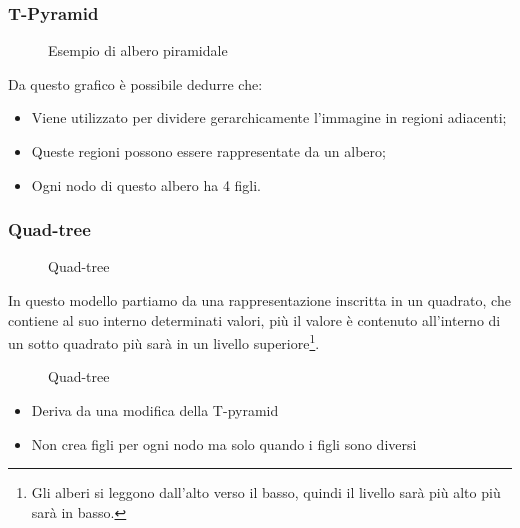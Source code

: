 \documentclass{report}
\begin{document}
\subsubsection{T-Pyramid}
\label{sec:treepy}
\begin{figure}[ht!]
  \centering
  \resizebox{15cm}{!}{
  }
  \caption{Esempio di albero piramidale}
  \label{fig:alberopir}
\end{figure}
Da questo grafico è possibile dedurre che:
\begin{itemize}
\item Viene utilizzato per dividere gerarchicamente l'immagine in regioni
  adiacenti;
\item Queste regioni possono essere rappresentate da un albero;
\item Ogni nodo di questo albero ha 4 figli.
\end{itemize}

\subsubsection{Quad-tree}
\label{sec:quad-tree}
\begin{figure}[ht!]
  \centering
  
  \caption{Quad-tree}
  \label{fig:qtree1}
\end{figure}
In questo modello partiamo da una rappresentazione inscritta in un
quadrato, che contiene al suo interno determinati valori, più il valore
è contenuto all'interno di un sotto quadrato più sarà in un livello
superiore\footnote{Gli alberi si leggono dall'alto verso il basso, quindi
  il livello sarà più alto più sarà in basso.}.
\begin{figure}[ht!]
  \centering
  
  \caption{Quad-tree}
  \label{fig:qtree2}
\end{figure}
\begin{itemize}
\item Deriva da una modiﬁca della T-pyramid
\item Non crea figli per ogni nodo ma solo quando i figli sono diversi
\end{itemize}
\clearpage
\end{document}
